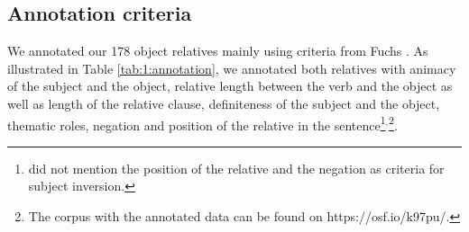 \documentclass[output=paper]{langscibook}
\begin{document}
\subsection{Annotation criteria}
We annotated our 178 object relatives mainly using criteria from Fuchs
\citep{catherine1997, Fuchs2006}. As illustrated in Table
\ref{tab:1:annotation}, we annotated both relatives with animacy of
the subject and the object, relative length between the verb and the
object as well as length of the relative clause, definiteness of the
subject and the object, thematic roles, negation and position of the
relative in the sentence\footnote{\citet{Fuchs2006} did not mention
  the position of the relative and the negation as criteria for
  subject inversion.}$^{,}$\footnote{The corpus with the annotated
  data can be found on https://osf.io/k97pu/.}.
\end{document}
